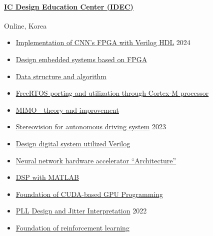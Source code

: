 \documentclass[a4paper,9pt]{extarticle}
\begin{document}
\paragraph{\large{\href{https://www.idec.or.kr/main/}{IC Design Education Center (IDEC)}}}  \hfill Online, Korea
\begin{itemize}
    \item \href{https://github.com/user-attachments/assets/234ad610-a051-4140-9f20-48ca4d8e4d42}{Implementation of CNN's FPGA with Verilog HDL}                         \hfill 2024
    \item \href{https://github.com/user-attachments/assets/68b0ae05-462b-4750-93ba-1bc4072dab66}{Design embedded systems based on FPGA}
    \item \href{https://github.com/user-attachments/assets/8fbda935-4b41-44f7-b83a-8d284f003168}{Data structure and algorithm}                                          
    \item \href{https://github.com/user-attachments/assets/805bbc13-3e6e-43d6-af75-df31f728d607}{FreeRTOS porting and utilization through Cortex-M processor}           
    \item \href{https://github.com/user-attachments/assets/707a4f8e-3b5a-4246-a763-81e2729f9cb2}{MIMO - theory and improvement}                                         
\end{itemize}

\begin{itemize}
    \item \href{https://github.com/user-attachments/assets/2d45999d-1f66-467c-b956-e16b5ed71593}{Stereovision for autonomous driving system}                            \hfill 2023
    \item \href{https://github.com/user-attachments/assets/32bfc1d6-18cf-44a4-83dc-209b4f4686ac}{Design digital system utilized Verilog}
    \item \href{https://github.com/user-attachments/assets/094a58df-f320-45fb-aba3-707f4a7fd8f7}{Neural network hardware accelerator ``Architecture''}
    \item \href{https://github.com/user-attachments/assets/9f74252d-eae5-40b2-b305-ea90576100aa}{DSP with MATLAB}
    \item \href{https://github.com/user-attachments/assets/0fc8c167-bef1-4857-a664-a1b82c95e306}{Foundation of CUDA-based GPU Programming}    
\end{itemize}
\begin{itemize}
    \item \href{https://github.com/user-attachments/assets/b4e013f1-d7b8-4505-a4f5-12e270097549}{PLL Design and Jitter Interpretation}                                  \hfill 2022
    \item \href{https://github.com/user-attachments/assets/73933790-2b15-46ae-8ac2-c6eaf31d9e01}{Foundation of reinforcement learning}                                  
\end{itemize}
\end{document}
